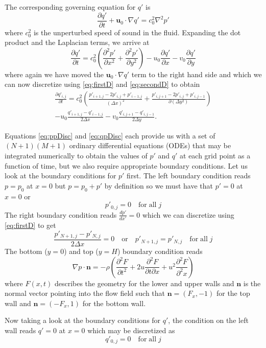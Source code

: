 \documentclass[11pt]{article}
\begin{document}
The corresponding governing equation for $q'$ is
\begin{equation}
  \frac{\partial q'}{\partial t} + \mathbf{u}_0 \cdot \nabla q' = c_0^2 \nabla^2 p'
\end{equation}
where $c_0^2$ is the unperturbed speed of sound in the fluid. Expanding the dot product and the Laplacian terms, we arrive at
\begin{equation}
  \frac{\partial q'}{\partial t} = c_0^2 \left( \frac{\partial^2 p'}{\partial x^2} + \frac{\partial^2 p'}{\partial y^2}\right) - u_0 \frac{\partial q'}{\partial x} - v_0 \frac{\partial q'}{\partial y}
\end{equation}
where again we have moved the $\mathbf{u}_0 \cdot \nabla q'$ term to the right hand side and which we can now discretize using \eqref{eq:firstD} and \eqref{eq:secondD} to obtain
\begin{multline} \label{eq:qpDisc}
  \frac{\partial q'_{i,j}}{\partial t} = c_0^2 \left( \frac{p'_{i+1,j} - 2p'_{i,j} + p'_{i-1,j}}{(\Delta x)^2} + \frac{p'_{i,j+1} - 2p'_{i,j} + p'_{i,j-1}}{\partial (\Delta y^2)} \right) \\
  - u_0\frac{q'_{i+1,j} - q'_{i-1,j}}{2\Delta x} - v_0 \frac{q'_{i,j+1} - q'_{i,j-1}}{2\Delta y}.
\end{multline}

Equations \eqref{eq:ppDisc} and \eqref{eq:qpDisc} each provide us with a set of $(N+1)(M+1)$ ordinary differential equations (ODEs) that may be integrated numerically to obtain the values of $p'$ and $q'$ at each grid point as a function of time, but we also require appropriate boundary conditions. Let us look at the boundary conditions for $p'$ first. The left boundary condition reads $p = p_0$ at $x = 0$ but $p = p_0 + p'$ by definition so we must have that $p' = 0$ at $x = 0$ or
\begin{equation}
  p'_{0,j} = 0 \quad \mathrm{for \; all} \; j
\end{equation}
The right boundary condition reads $\displaystyle \frac{dp'}{dx'} = 0$ which we can discretize using \eqref{eq:firstD} to get
\begin{equation}
  \frac{p'_{N+1,j} - p'_{N,j}}{2\Delta x} = 0 \quad \mathrm{or} \quad p'_{N+1,j} = p'_{N,j} \quad \mathrm{for \; all} \; j
\end{equation}
The bottom ($y=0$) and top ($y=H$) boundary condition reads 
\begin{equation}
  \nabla p \cdot \mathbf{n} = -\rho \left( \frac{\partial^2 F}{\partial t^2} + 2u\frac{\partial^2 F}{\partial t \partial x} + u^2 \frac{\partial^2 F}{\partial^2 x} \right)
\end{equation}
where $F(x,t)$ describes the geometry for the lower and upper walls and $\mathbf{n}$ is the normal vector pointing into the flow field such that $\mathbf{n} = (F_x, -1)$ for the top wall and $\mathbf{n} = (-F_x, 1)$ for the bottom wall.

Now taking a look at the boundary conditions for $q'$, the condition on the left wall reads $q' = 0$ at $x = 0$ which may be discretized as
\begin{equation}
q'_{0,j} = 0 \quad \mathrm{for \; all} \; j
\end{equation}
\end{document}
